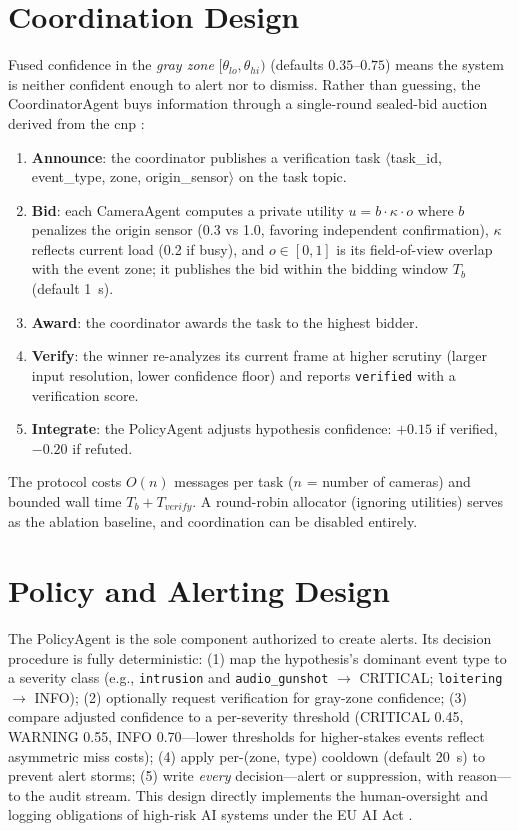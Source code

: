 \section{Coordination Design}
\label{sec:design_coordination}

Fused confidence in the \emph{gray zone} $[\theta_{lo}, \theta_{hi})$ (defaults $0.35$--$0.75$) means the system is neither confident enough to alert nor to dismiss. Rather than guessing, the CoordinatorAgent buys information through a single-round sealed-bid auction derived from the \gls{cnp} \cite{smith1980contract}:

\begin{enumerate}
    \item \textbf{Announce}: the coordinator publishes a verification task $\langle$task\_id, event\_type, zone, origin\_sensor$\rangle$ on the task topic.
    \item \textbf{Bid}: each CameraAgent computes a private utility $u = b \cdot \kappa \cdot o$ where $b$ penalizes the origin sensor (0.3 vs 1.0, favoring independent confirmation), $\kappa$ reflects current load (0.2 if busy), and $o \in [0,1]$ is its field-of-view overlap with the event zone; it publishes the bid within the bidding window $T_b$ (default 1~s).
    \item \textbf{Award}: the coordinator awards the task to the highest bidder.
    \item \textbf{Verify}: the winner re-analyzes its current frame at higher scrutiny (larger input resolution, lower confidence floor) and reports \texttt{verified} with a verification score.
    \item \textbf{Integrate}: the PolicyAgent adjusts hypothesis confidence: $+0.15$ if verified, $-0.20$ if refuted.
\end{enumerate}

The protocol costs $O(n)$ messages per task ($n$ = number of cameras) and bounded wall time $T_b + T_{verify}$. A round-robin allocator (ignoring utilities) serves as the ablation baseline, and coordination can be disabled entirely.

\section{Policy and Alerting Design}

The PolicyAgent is the sole component authorized to create alerts. Its decision procedure is fully deterministic: (1) map the hypothesis's dominant event type to a severity class (e.g., \texttt{intrusion} and \texttt{audio\_gunshot} $\rightarrow$ CRITICAL; \texttt{loitering} $\rightarrow$ INFO); (2) optionally request verification for gray-zone confidence; (3) compare adjusted confidence to a per-severity threshold (CRITICAL 0.45, WARNING 0.55, INFO 0.70---lower thresholds for higher-stakes events reflect asymmetric miss costs); (4) apply per-(zone, type) cooldown (default 20~s) to prevent alert storms; (5) write \emph{every} decision---alert or suppression, with reason---to the audit stream. This design directly implements the human-oversight and logging obligations of high-risk AI systems under the EU AI Act \cite{euaiact2024}.


